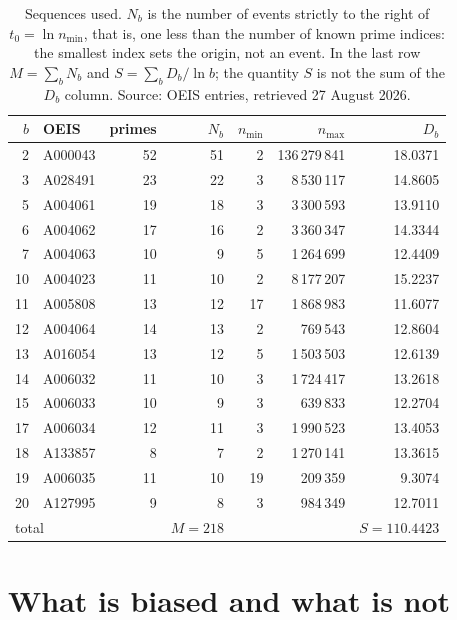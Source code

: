 \documentclass[11pt,a4paper]{article}
\theoremstyle{plain}
\theoremstyle{remark}
\begin{document}
\begin{table}[t]
\centering
\caption{Sequences used. $N_b$ is the number of events strictly to the right of
$t_0=\ln n_{\min}$, that is, one less than the number of known prime indices:
the smallest index sets the origin, not an event. In the last row
$M=\sum_b N_b$ and $S=\sum_b D_b/\ln b$; the quantity $S$ is not the sum of the
$D_b$ column. Source: OEIS entries, retrieved 27 August 2026.}
\label{tab:data}
\small
\begin{tabular}{rlrrrrr}
\toprule
$b$ & OEIS & primes & $N_b$ & $n_{\min}$ & $n_{\max}$ & $D_b$\\
\midrule
2 & A000043 & 52 & 51 & 2 & 136\,279\,841 & 18.0371\\
3 & A028491 & 23 & 22 & 3 & 8\,530\,117 & 14.8605\\
5 & A004061 & 19 & 18 & 3 & 3\,300\,593 & 13.9110\\
6 & A004062 & 17 & 16 & 2 & 3\,360\,347 & 14.3344\\
7 & A004063 & 10 & 9 & 5 & 1\,264\,699 & 12.4409\\
10 & A004023 & 11 & 10 & 2 & 8\,177\,207 & 15.2237\\
11 & A005808 & 13 & 12 & 17 & 1\,868\,983 & 11.6077\\
12 & A004064 & 14 & 13 & 2 & 769\,543 & 12.8604\\
13 & A016054 & 13 & 12 & 5 & 1\,503\,503 & 12.6139\\
14 & A006032 & 11 & 10 & 3 & 1\,724\,417 & 13.2618\\
15 & A006033 & 10 & 9 & 3 & 639\,833 & 12.2704\\
17 & A006034 & 12 & 11 & 3 & 1\,990\,523 & 13.4053\\
18 & A133857 & 8 & 7 & 2 & 1\,270\,141 & 13.3615\\
19 & A006035 & 11 & 10 & 19 & 209\,359 & 9.3074\\
20 & A127995 & 9 & 8 & 3 & 984\,349 & 12.7011\\
\midrule
\multicolumn{3}{l}{total} & $M=218$ & & & $S=110.4423$\\
\bottomrule
\end{tabular}
\end{table}

\section{What is biased and what is not}\label{sec:notbias}
\end{document}
